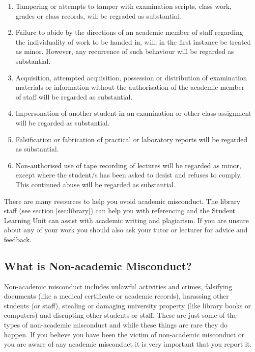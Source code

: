 \documentclass[a4paper,oneside]{book}
\begin{document}
\begin{enumerate}
\item Tampering or attempts to tamper with examination scripts, class
  work, grades or class records, will be regraded as substantial.

\item Failure to abide by the directions of an academic member of
  staff regarding the individuality of work to be handed in, will, in
  the first instance be treated as minor.  However, any recurrence
  of such behaviour will be regarded as substantial.

\item Acquisition, attempted acquisition, possession or distribution
  of examination materials or information without the authorisation of
  the academic member of staff will be regarded as substantial.

\item Impersonation of another student in an examination or other class
assignment will be regarded as substantial.

\item Falsification or fabrication of practical or laboratory reports
will be regarded as substantial.

\item Non-authorised use of tape recording of lectures will be regarded
as minor, except where the student/s has been asked to desist and
refuses to comply.  This continued abuse will be regarded as
substantial.
\end{enumerate}


There are many resources to help you ovoid academic misconduct.  The
library staff (see section \ref{sec:library}) can help you with referencing and the
Student Learning Unit can assist with academic writing and plagiarism.
If you are unsure about any of your work you should also ask your
tutor or lecturer for advice and feedback.

\subsection*{What is Non-academic Misconduct?}

Non-academic misconduct includes unlawful activities and crimes,
falsifying documents (like a medical certificate or academic records),
harassing other students (or staff), stealing or damaging university
property (like library books or computers) and disrupting other
students or staff.  These are just some of the types of non-academic
misconduct and while these things are rare they do happen.  If you
believe you have been the victim of non-academic misconduct or you are
aware of any academic misconduct it is very important that you report
it.
\end{document}
